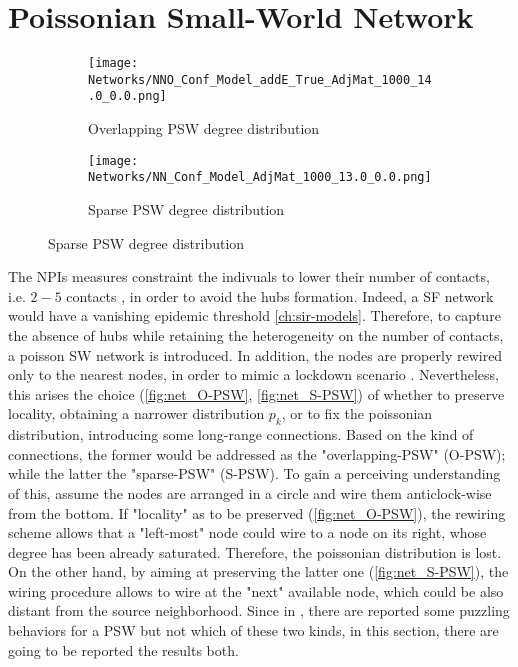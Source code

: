 \documentclass[a4paper,10pt,twoside]{book} %
\theoremstyle{definition}
\begin{document}
\section{Poissonian Small-World Network}
\begin{figure}[ht]
    \begin{subfigure}{.45\linewidth}
        \texttt{[image: Networks/NNO\_Conf\_Model\_addE\_True\_AdjMat\_1000\_14.0\_0.0.png]}
        \centering
        \caption{Overlapping PSW degree distribution}
        \label{fig:net_O-PSW}
    \end{subfigure}
	\hfill
	\begin{subfigure}{.45\linewidth}
        \texttt{[image: Networks/NN\_Conf\_Model\_AdjMat\_1000\_13.0\_0.0.png]}
        \centering
        \caption{Sparse PSW degree distribution}
        \label{fig:net_S-PSW}
    \end{subfigure}
\end{figure}
The NPIs measures constraint the indivuals to lower their number of contacts, i.e. $2-5$ contacts \cite{Liu::2021_Review_SContactPattern}, in order to avoid the hubs formation. Indeed, a SF network would have a vanishing epidemic threshold \autoref{ch:sir-models}.
Therefore, to capture the absence of hubs while retaining the heterogeneity on the number of contacts, a poisson SW network is introduced. In addition, the nodes are properly rewired only to the nearest nodes, in order to mimic a lockdown scenario \cite{Thurner::Appendix_NetBasedExpl}. Nevertheless, this arises the choice (\autoref{fig:net_O-PSW}, \autoref{fig:net_S-PSW}) of whether to preserve locality, obtaining a narrower distribution $p_k$, or to fix the poissonian distribution, introducing some long-range connections. Based on the kind of connections, the former would be addressed as the "overlapping-PSW" (O-PSW); while the latter the "sparse-PSW" (S-PSW). To gain a perceiving understanding of this, assume the nodes are arranged in a circle and wire them anticlock-wise from the bottom. If "locality" as to be preserved (\autoref{fig:net_O-PSW}), the rewiring scheme allows that a "left-most" node could wire to a node on its right, whose degree has been already saturated. Therefore, the poissonian distribution is lost. On the other hand, by aiming at preserving the latter one (\autoref{fig:net_S-PSW}), the wiring procedure allows to wire at the "next" available node, which could be also distant from the source neighborhood. Since in \cite{Thurner::Appendix_NetBasedExpl}, there are reported some puzzling behaviors for a PSW but not which of these two kinds, in this section, there are going to be reported the results both.
\end{document}
